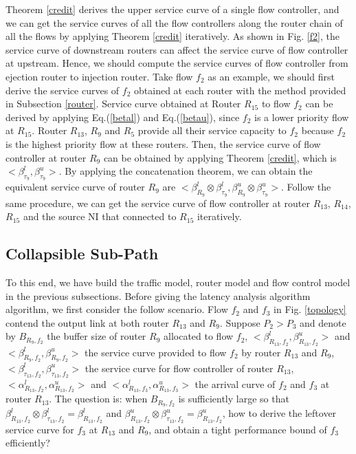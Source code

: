 \documentclass[10pt,journal]{IEEEtran}
\begin{document}
Theorem \ref{credit} derives the upper service curve of a single flow controller, and we can get the service curves of all the flow controllers along the router chain of all the flows by applying Theorem \ref{credit} iteratively. As shown in Fig. \ref{f2}, the service curve of downstream routers can affect the service curve of flow controller at upstream. Hence, we should compute the service curves of flow controller from ejection router to injection router. Take flow $f_2$ as an example, we should first derive the service curves of $f_2$ obtained at each router with the method provided in Subsection \ref{router}. Service curve obtained at Router $R_{15}$ to flow $f_2$ can be derived by applying Eq.(\ref{betal}) and Eq.(\ref{betau}), since $f_2$ is a lower priority flow at $R_{15}$. Router $R_{13}$, $R_{9}$ and $R_{5}$ provide all their service capacity to $f_2$ because $f_2$ is the highest priority flow at these routers. Then, the service curve of flow controller at router $R_{9}$ can be obtained by applying Theorem \ref{credit}, which is $<\beta_{\tau_9}^l,\beta_{\tau_9}^u>$. By applying the concatenation theorem, we can obtain the equivalent service curve of router $R_{9}$ are $<\beta_{R_9}^l\otimes\beta_{\tau_9}^l,\beta_{R_9}^u\otimes\beta_{\tau_9}^u>$. Follow the same procedure, we can get the service curve of flow controller at router $R_{13}$, $R_{14}$, $R_{15}$ and the source NI that connected to $R_{15}$ iteratively.

\subsection{Collapsible Sub-Path}\label{csp}
To this end, we have build the traffic model, router model and flow control model in the previous subsections. Before giving the latency analysis algorithm algorithm, we first consider the follow scenario. Flow $f_2$ and $f_3$ in Fig. \ref{topology} contend the output link at both router $R_{13}$ and $R_{9}$. Suppose $P_2>P_3$ and denote by $B_{R_9,f_2}$ the buffer size of router $R_{9}$ allocated to flow $f_2$, $<\beta_{R_{13},f_2}^l,\beta_{R_{13},f_2}^u>$ and $<\beta_{R_{9},f_2}^l,\beta_{R_{9},f_2}^u>$ the service curve provided to flow $f_2$ by router $R_{13}$ and $R_{9}$, $<\beta_{\tau_{13},f_2}^l,\beta_{\tau_{13},f_2}^u>$ the service curve for flow controller of router $R_{13}$, $<\alpha_{R_{13},f_2}^l,\alpha_{R_{13},f_2}^u>$ and $<\alpha_{R_{13},f_3}^l,\alpha_{R_{13},f_3}^u>$ the arrival curve of $f_2$ and $f_3$ at router $R_{13}$. The question is: when $B_{R_9,f_2}$ is sufficiently large so that $\beta_{R_{13},f_2}^l\otimes\beta_{\tau_{13},f_2}^l=\beta_{R_{13},f_2}^l$ and $\beta_{R_{13},f_2}^u\otimes\beta_{\tau_{13},f_2}^u=\beta_{R_{13},f_2}^u$, how to derive the leftover service curve for $f_3$ at $R_{13}$ and $R_9$, and obtain a tight performance bound of $f_3$ efficiently?
\end{document}
